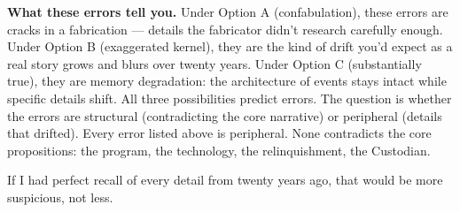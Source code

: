 \vspace{1cm}

\textbf{What these errors tell you.} Under Option A (confabulation), these errors are cracks in a fabrication --- details the fabricator didn't research carefully enough. Under Option B (exaggerated kernel), they are the kind of drift you'd expect as a real story grows and blurs over twenty years. Under Option C (substantially true), they are memory degradation: the architecture of events stays intact while specific details shift. All three possibilities predict errors. The question is whether the errors are structural (contradicting the core narrative) or peripheral (details that drifted). Every error listed above is peripheral. None contradicts the core propositions: the program, the technology, the relinquishment, the Custodian.

If I had perfect recall of every detail from twenty years ago, that would be more suspicious, not less.
